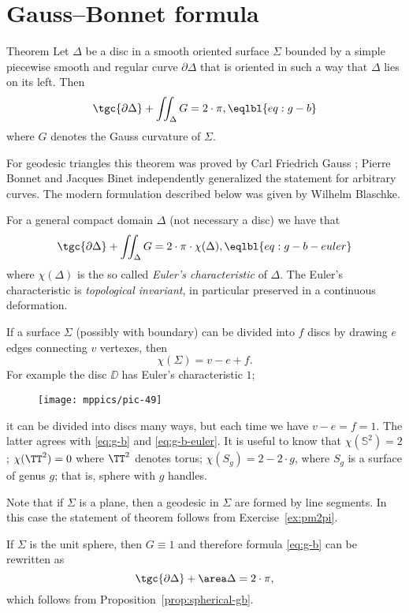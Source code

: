\section*{Gauss--Bonnet formula}


\begin{thm}{Theorem}\label{thm:gb}
Let $\Delta$ be a disc in a smooth oriented surface $\Sigma$ bounded by a simple piecewise smooth and regular curve $\partial \Delta$ that is oriented in such a way that $\Delta$ lies on its left.
Then 
\[\tgc{\partial\Delta}+\iint_\Delta G=2\cdot \pi,\eqlbl{eq:g-b}\]
where $G$ denotes the Gauss curvature of $\Sigma$.
\end{thm}

For geodesic triangles this theorem was proved by Carl Friedrich Gauss \cite{gauss};
Pierre Bonnet and Jacques Binet independently generalized the statement for arbitrary curves. 
The modern formulation described below was given by Wilhelm Blaschke. 


For a general compact domain $\Delta$ (not necessary a disc) we have that
\[\tgc{\partial\Delta}+\iint_{\Delta} G=2\cdot  \pi\cdot\chi(\Delta),\eqlbl{eq:g-b-euler}\]
where $\chi(\Delta)$ is the so called \emph{Euler's characteristic} of $\Delta$.
The Euler's characteristic is \emph{topological invariant}, in particular preserved in a continuous deformation.

If a surface $\Sigma$ (possibly with boundary) can be divided into $f$ discs by drawing $e$ edges connecting $v$ vertexes, then 
\[\chi(\Sigma)=v-e+f.\]
For example the disc $\DD$ has Euler's characteristic $1$; 
\begin{figure}[h!]
\vskip-0mm
\centering
\texttt{[image: mppics/pic-49]}
\vskip-0mm
\end{figure}
it can be divided into discs many ways, 
but each time we have $v-e=f=1$.
The latter agrees with \ref{eq:g-b} and \ref{eq:g-b-euler}.
It is useful to know that $\chi(\mathbb{S}^2)=2$; $\chi(\TT^2)=0$ where $\TT^2$ denotes torus; 
$\chi(S_g)=2-2\cdot g$, where $S_g$ is a surface of genus $g$;
that is, sphere with $g$ handles.

 Note that if $\Sigma$ is a plane, then a geodesic in $\Sigma$ are formed by line segments.
In this case the statement of theorem follows from Exercise~\ref{ex:pm2pi}.

 If $\Sigma$ is the unit sphere, then $G\equiv1$ and therefore formula \ref{eq:g-b} can be rewritten as 
\[\tgc{\partial\Delta}+\area\Delta=2\cdot \pi,\]
which follows from Proposition~\ref{prop:spherical-gb}.

